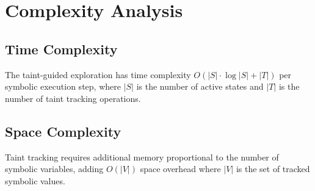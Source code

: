 \section{Complexity Analysis}
\subsection{Time Complexity}
The taint-guided exploration has time complexity $O(|S| \cdot \log|S| + |T|)$ per symbolic execution step, where $|S|$ is the number of active states and $|T|$ is the number of taint tracking operations.

\subsection{Space Complexity}
Taint tracking requires additional memory proportional to the number of symbolic variables, adding $O(|V|)$ space overhead where $|V|$ is the set of tracked symbolic values.
